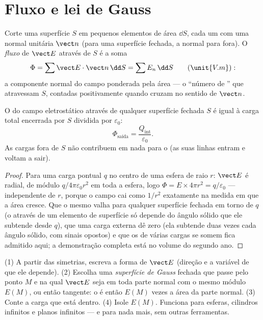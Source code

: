 \section{Fluxo e lei de Gauss}

\begin{definition}\label{def:b1:electrostatics-gauss:flux}
Corte uma superfície $S$ em pequenos elementos de área $\dd S$, cada um com uma
normal unitária $\vect n$ (para uma superfície fechada, a normal para fora). O
\emph{fluxo} de $\vect E$ através de $S$ é a soma
\[
\Phi = \sum \vect E\cdot\vect n\,\dd S = \sum E_n\,\dd S \qquad (\unit{V.m}):
\]
a componente normal do campo ponderada pela área --- o ``número de '' que atravessam $S$, contadas positivamente quando cruzam no sentido de
$\vect n$.
\end{definition}

\begin{theorem}\label{thm:b1:electrostatics-gauss:gauss}
O  do campo eletrostático através de qualquer superfície fechada $S$
é igual à carga total encerrada por $S$ dividida por $\varepsilon_0$:
\[
\Phi_{\text{saída}} = \frac{Q_{\text{int}}}{\varepsilon_0} .
\]
As cargas fora de $S$ não contribuem em nada para o  (as suas linhas entram
e voltam a sair).
\end{theorem}

\begin{proof}
Para uma carga pontual $q$ no centro de uma esfera de raio $r$:
$\vect E$ é radial, de módulo $q/4\pi\varepsilon_0r^2$ em toda a
esfera, logo $\Phi = E \times 4\pi r^2 = q/\varepsilon_0$ --- independente de $r$,
porque o campo cai como $1/r^2$ exatamente na medida em que a área cresce. Que o
mesmo valha para qualquer superfície fechada em torno de $q$ (o  através de um
elemento de superfície só depende do ângulo sólido que ele subtende desde $q$),
que uma carga externa dê zero (ela subtende duas vezes cada ângulo sólido,
com sinais opostos) e que os  de várias cargas se somem fica
admitido aqui; a demonstração completa está no volume do segundo ano.
\end{proof}

\begin{method}\label{meth:b1:electrostatics-gauss:gauss}
(1) A partir das simetrias, escreva a forma de $\vect E$ (direção e a
variável de que ele depende). (2) Escolha uma \emph{superfície de Gauss} fechada
que passe pelo ponto $M$ e na qual $\vect E$ seja em toda parte normal com
o mesmo módulo $E(M)$, ou então tangente: o  é então $E(M)$ vezes a
área da parte normal. (3) Conte a carga que está dentro. (4) Isole
$E(M)$. Funciona para esferas, cilindros infinitos e planos infinitos
--- e para nada mais, sem outras ferramentas.
\end{method}

